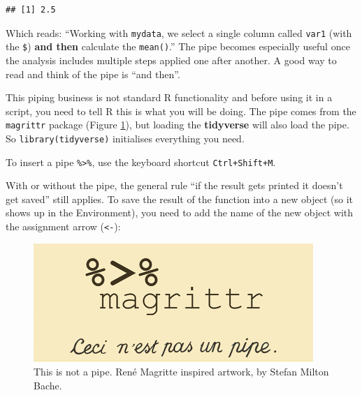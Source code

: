 \documentclass[
  12pt,
  krantz2]{krantz}
\makeatletter
\newenvironment{Shaded}{\begin{snugshade}}{\end{snugshade}}
\newcommand{\KeywordTok}[1]{\textcolor[rgb]{0.13,0.29,0.53}{\textbf{#1}}}
\newcommand{\NormalTok}[1]{#1}
\newcommand{\OperatorTok}[1]{\textcolor[rgb]{0.81,0.36,0.00}{\textbf{#1}}}
\newcommand{\StringTok}[1]{\textcolor[rgb]{0.31,0.60,0.02}{#1}}
\renewenvironment{quote}{\begin{VF}}{\end{VF}}
\newenvironment{kframe}{%
\medskip{}
\setlength{\fboxsep}{.8em}
 \def\at@end@of@kframe{}%
 \ifinner\ifhmode%
  \def\at@end@of@kframe{\end{minipage}}%
  \begin{minipage}{\columnwidth}%
 \fi\fi%
 \def\FrameCommand##1{\hskip\@totalleftmargin \hskip-\fboxsep
 \colorbox{shadecolor}{##1}\hskip-\fboxsep
     \hskip-\linewidth \hskip-\@totalleftmargin \hskip\columnwidth}%
 \MakeFramed {\advance\hsize-\width
   \@totalleftmargin\z@ \linewidth\hsize
   \@setminipage}}%
 {\par\unskip\endMakeFramed%
 \at@end@of@kframe}
\renewenvironment{Shaded}{\begin{kframe}}{\end{kframe}}
\makeatother
\begin{document}
\begin{verbatim}
## [1] 2.5
\end{verbatim}

Which reads: ``Working with \texttt{mydata}, we select a single column called \texttt{var1} (with the \texttt{\$}) \textbf{and then} calculate the \texttt{mean()}.''
The pipe becomes especially useful once the analysis includes multiple steps applied one after another.
A good way to read and think of the pipe is ``and then''.

This piping business is not standard R functionality and before using it in a script, you need to tell R this is what you will be doing.
The pipe comes from the \texttt{magrittr} package (Figure \ref{fig:chap2-fig-pipe}), but loading the \textbf{tidyverse} will also load the pipe.
So \texttt{library(tidyverse)} initialises everything you need.

\begin{quote}
To insert a pipe \texttt{\%\textgreater{}\%}, use the keyboard shortcut \texttt{Ctrl+Shift+M}.
\end{quote}

With or without the pipe, the general rule ``if the result gets printed it doesn't get saved'' still applies.
To save the result of the function into a new object (so it shows up in the Environment), you need to add the name of the new object with the assignment arrow (\texttt{\textless{}-}):

\begin{Shaded}
\end{Shaded}

\begin{figure}

{\centering \includegraphics[width=0.7\linewidth]{images/chapter02/magrittr} 

}

\caption{This is not a pipe. René Magritte inspired artwork, by Stefan Milton Bache.}\label{fig:chap2-fig-pipe}
\end{figure}
\end{document}
